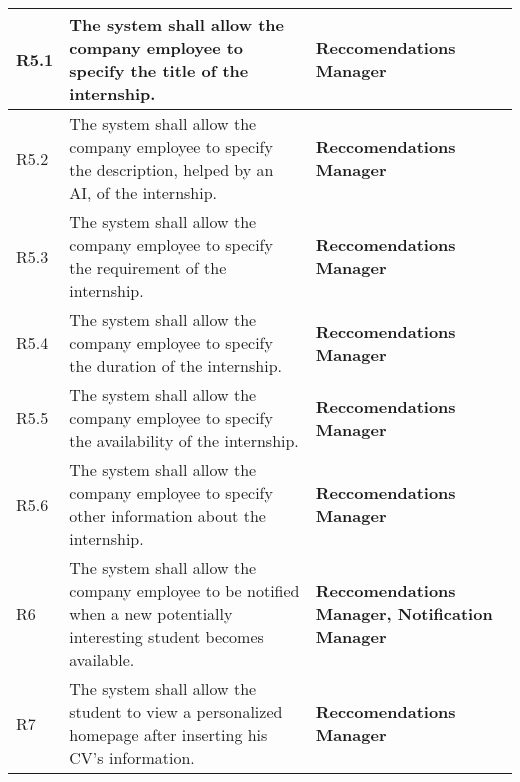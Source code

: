 \begin{center}
\begin{longtable}{|l|p{8cm}|p{5cm}|}
        R5.1  & The system shall allow the company employee to specify the title of the
internship.                                                                                   & \textbf{Reccomendations Manager}                                                  \\\hline
        R5.2  &  The system shall allow the company employee to specify the description,
helped by an AI, of the internship.                                                                                                              & \textbf{Reccomendations Manager}                                                  \\\hline
        R5.3  & The system shall allow the company employee to specify the requirement of the internship.                                                                                                           & \textbf{Reccomendations Manager}                                                  \\\hline
        R5.4  & The system shall allow the company employee to specify the duration of the internship.                                                                                                             & \textbf{Reccomendations Manager}                          \\\hline
        R5.5  & The system shall allow the company employee to specify the availability of the internship.                                                                                                       & \textbf{Reccomendations Manager}                          \\\hline
        R5.6  & The system shall allow the company employee to specify other information about the internship.                                                                                                            & \textbf{Reccomendations Manager}                                                                                                 \\\hline
        R6    & The system shall allow the company employee to be notified when a new potentially interesting student becomes available.                                                                  & \textbf{Reccomendations Manager, Notification Manager}                                                  \\\hline
        R7    & The system shall allow the student to view a personalized homepage after inserting his CV’s information.                                                                                          & \textbf{Reccomendations Manager}                                              \\\hline

\end{longtable}
\end{center}
